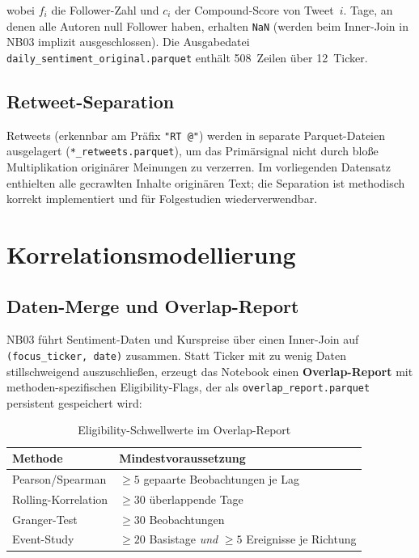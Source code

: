 \documentclass[11pt, a4paper]{article}
\begin{document}
wobei $f_i$ die Follower-Zahl und $c_i$ der Compound-Score von Tweet~$i$.
Tage, an denen alle Autoren null Follower haben, erhalten \texttt{NaN}
(werden beim Inner-Join in NB03 implizit ausgeschlossen).
Die Ausgabedatei \texttt{daily\_sentiment\_original.parquet}
enthält 508~Zeilen über 12~Ticker.

\subsection{Retweet-Separation}

Retweets (erkennbar am Präfix \texttt{"RT @"}) werden in separate
Parquet-Dateien ausgelagert (\texttt{*\_retweets.parquet}), um das
Primärsignal nicht durch bloße Multiplikation originärer Meinungen zu
verzerren. Im vorliegenden Datensatz enthielten alle gecrawlten Inhalte
originären Text; die Separation ist methodisch korrekt implementiert und
für Folgestudien wiederverwendbar.

\section{Korrelationsmodellierung}
\label{sec:korrelation}

\subsection{Daten-Merge und Overlap-Report}

NB03 führt Sentiment-Daten und Kurspreise über einen Inner-Join auf
\texttt{(focus\_ticker, date)} zusammen. Statt Ticker mit zu wenig Daten
stillschweigend auszuschließen, erzeugt das Notebook einen
\textbf{Overlap-Report} mit methoden-spezifischen Eligibility-Flags, der als
\texttt{overlap\_report.parquet} persistent gespeichert wird:

\begin{table}[H]
\centering
\caption{Eligibility-Schwellwerte im Overlap-Report}
\begin{tabular}{ll}
\toprule
\textbf{Methode} & \textbf{Mindestvoraussetzung} \\
\midrule
Pearson/Spearman     & $\geq 5$ gepaarte Beobachtungen je Lag \\
Rolling-Korrelation  & $\geq 30$ überlappende Tage \\
Granger-Test         & $\geq 30$ Beobachtungen \\
Event-Study          & $\geq 20$ Basistage \emph{und} $\geq 5$ Ereignisse je Richtung \\
\bottomrule
\end{tabular}
\end{table}
\end{document}
